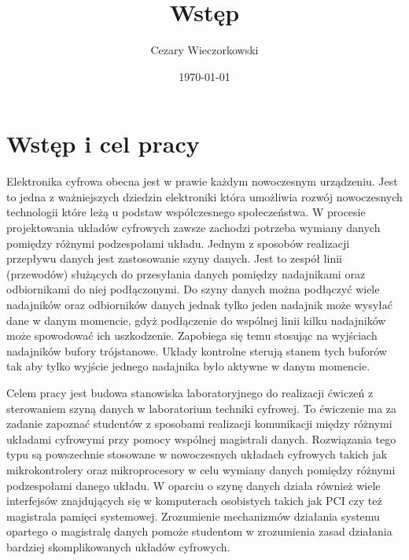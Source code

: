 \documentclass[../main.tex]{subfiles}
\author{Cezary Wieczorkowski}
\date{\today}
\title{Wstęp}
\begin{document}
\section{Wstęp i cel pracy}

Elektronika cyfrowa obecna jest w prawie każdym nowoczesnym urządzeniu. Jest to jedna z ważniejszych dziedzin elektroniki 
która umożliwia rozwój nowoczesnych technologii które leżą u podstaw współczesnego społeczeństwa. W procesie projektowania układów cyfrowych
zawsze zachodzi potrzeba wymiany danych pomiędzy różnymi podzespołami układu. Jednym z sposobów realizacji przepływu danych jest zastosowanie
szyny danych. Jest to zespół linii (przewodów) służących do przesyłania danych pomiędzy nadajnikami oraz odbiornikami do niej podłączonymi. 
Do szyny danych można podłączyć wiele nadajników oraz odbiorników danych jednak tylko jeden nadajnik może wysyłać dane w danym momencie, 
gdyż podłączenie do wspólnej linii kilku nadajników może spowodować ich uszkodzenie. Zapobiega się temu stosując na wyjściach 
nadajników bufory trójstanowe. Układy kontrolne sterują stanem tych buforów tak aby tylko wyjście jednego nadajnika było aktywne w danym
momencie. 
\par
Celem pracy jest budowa stanowiska laboratoryjnego do realizacji ćwiczeń z sterowaniem szyną danych w laboratorium techniki cyfrowej.
To ćwiczenie ma za zadanie zapoznać studentów z sposobami realizacji komunikacji między różnymi układami cyfrowymi przy pomocy
wspólnej magistrali danych. Rozwiązania tego typu są powszechnie stosowane w nowoczesnych układach cyfrowych takich jak mikrokontrolery oraz
mikroprocesory w celu wymiany danych pomiędzy różnymi podzespołami danego układu. W oparciu o szynę danych działa również wiele interfejsów 
znajdujących się w komputerach osobistych takich jak PCI czy też magistrala pamięci systemowej. Zrozumienie mechanizmów działania systemu opartego o 
magistralę danych pomoże studentom w zrozumienia zasad działania bardziej skomplikowanych układów cyfrowych.
\end{document}
